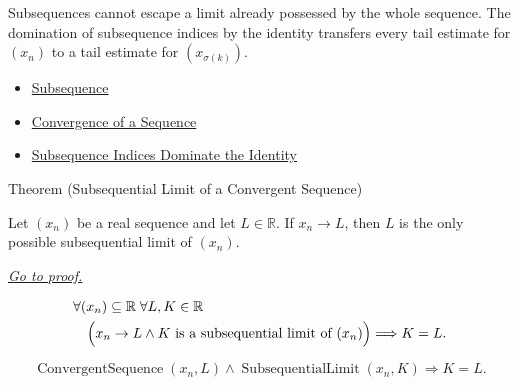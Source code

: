 \begin{remark*}[Interpretation]
Subsequences cannot escape a limit already possessed by the whole sequence.
The domination of subsequence indices by the identity transfers every tail
estimate for $(x_n)$ to a tail estimate for $(x_{\sigma(k)})$.
\end{remark*}

\begin{dependencies}
\begin{itemize}
  \item \hyperref[def:subsequence]{Subsequence}
  \item \hyperref[def:convergent-sequence]{Convergence of a Sequence}
  \item \hyperref[thm:subsequence-indices-dominate-identity]{Subsequence Indices Dominate the Identity}
\end{itemize}
\end{dependencies}


\begin{theorembox}{Theorem (Subsequential Limit of a Convergent Sequence)}
\begin{theorem}
\label{thm:subsequential-limit-of-convergent-sequence}
Let $(x_n)$ be a real sequence and let $L\in\mathbb{R}$. If $x_n\to L$,
then $L$ is the only possible subsequential limit of $(x_n)$.

\smallskip
\noindent
\hyperref[prf:subsequential-limit-of-convergent-sequence]{\textit{Go to proof.}}
\end{theorem}
\end{theorembox}

\begin{remark*}
\[
\begin{aligned}
&\forall (x_n)\subseteq\mathbb{R}\;\forall L,K\in\mathbb{R}\\
&\quad\Bigl(
  x_n\to L
  \land
  K\text{ is a subsequential limit of }(x_n)
\Bigr)
\Longrightarrow
K=L.
\end{aligned}
\]
\end{remark*}

\begin{remark*}
\[
\operatorname{ConvergentSequence}(x_n,L)
\land
\operatorname{SubsequentialLimit}(x_n,K)
\Longrightarrow
K=L.
\]
\end{remark*}

